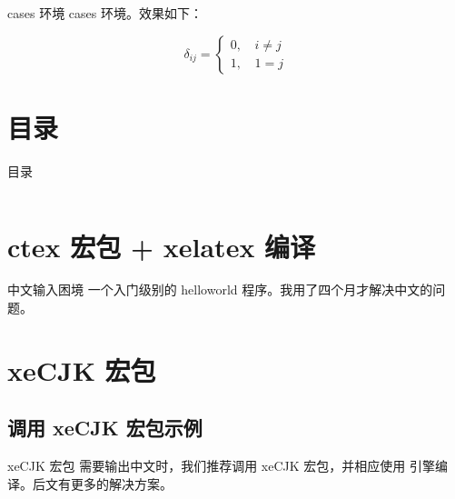 \documentclass[final,aspectratio=32]{ctexbeamer}
\begin{document}
\begin{frame}[fragile]{cases 环境}
cases 环境。效果如下：
\begin{sidelst}
\begin{equation}
  \delta_{ij} =
  \begin{cases}
    0, \, & i \ne j \\
    1, & 1 = j
  \end{cases}
\end{equation}
\end{sidelst}
\end{frame}

\section*{目录}
\begin{frame}{目录}
\begin{columns}
\begin{column}{.4\linewidth}
\small
\tableofcontents[hideallsubsections]
\end{column}
\begin{column}{.5\linewidth}
\end{column}
\end{columns}
\end{frame}

\section{ctex 宏包 + xelatex 编译}
\begin{frame}[fragile]{中文输入困境}
一个入门级别的 helloworld 程序。我用了四个月才解决中文的问题。
\end{frame}


\section{xeCJK 宏包}
\subsection[示例]{调用 xeCJK 宏包示例}
\begin{frame}[fragile]{xeCJK 宏包}
需要输出中文时，我们推荐调用 xeCJK 宏包，并相应使用  引擎编译。后文有更多的解决方案。
\end{frame}
\end{document}
